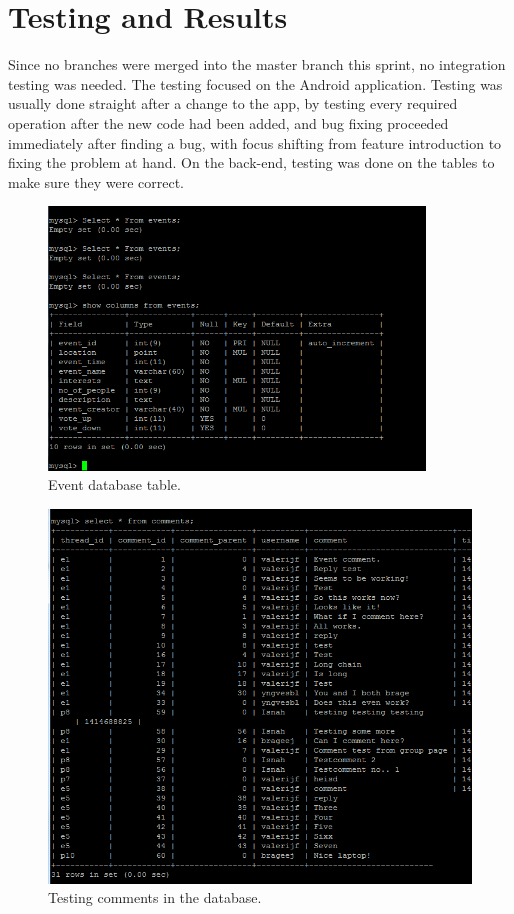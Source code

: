 \section{Testing and Results}
\label{sec:S4Testing}

Since no branches were merged into the master branch this sprint, no integration testing was needed. The testing focused on the Android application. Testing was usually done straight after a change to the app, by testing every required operation after the new code had been added, and bug fixing proceeded immediately after finding a bug, with focus shifting from feature introduction to fixing the problem at hand. On the back-end, testing was done on the tables to make sure they were correct.

\begin{figure}
    \centering
    \includegraphics[width=100mm]{./Sprint4/img/eventTable}
    \caption{Event database table.}
    \label{fig:S4TestingEvent}
\end{figure}

\begin{figure}
    \centering
    \includegraphics[width=\linewidth]{./Sprint4/img/commentsDB}
    \caption{Testing comments in the database.}
    \label{fig:S4TestingComments}
\end{figure}

